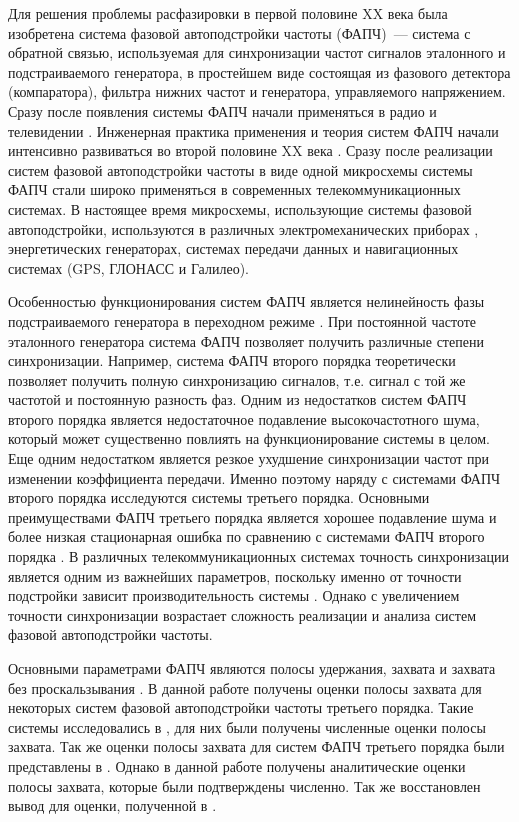 \documentclass[a4paper,article,14pt]{extarticle}
\begin{document}
Для решения проблемы расфазировки в первой половине XX века была изобретена система фазовой автоподстройки частоты \cite{appleton} (ФАПЧ)~--- система с обратной связью, используемая для синхронизации частот сигналов эталонного и подстраиваемого генератора, в простейшем виде состоящая из фазового детектора (компаратора), фильтра нижних частот и генератора, управляемого напряжением. Сразу после появления системы ФАПЧ начали применяться в радио и телевидении \cite{blagov}. Инженерная практика применения и теория систем ФАПЧ начали интенсивно развиваться во второй половине XX века \cite{seledji}. Сразу после реализации систем фазовой автоподстройки частоты в виде одной микросхемы системы ФАПЧ стали широко применяться в современных телекоммуникационных системах. В настоящее время микросхемы, использующие системы фазовой автоподстройки, используются в различных электромеханических приборах \cite{best}, энергетических генераторах, системах передачи данных \cite{ashari} и навигационных системах \cite{rao} (GPS, ГЛОНАСС и Галилео).

Особенностью функционирования систем ФАПЧ является нелинейность фазы подстраиваемого генератора в переходном режиме \cite{kuznetsov_nonlinear}. При постоянной частоте эталонного генератора система ФАПЧ позволяет получить различные степени синхронизации. Например, система ФАПЧ второго порядка теоретически позволяет получить полную синхронизацию сигналов, т.е. сигнал с той же частотой и постоянную разность фаз. Одним из недостатков систем ФАПЧ второго порядка является недостаточное подавление высокочастотного шума, который может существенно повлиять на функционирование системы в целом. Еще одним недостатком является резкое ухудшение синхронизации частот при изменении коэффициента передачи. Именно поэтому наряду с системами ФАПЧ второго порядка исследуются системы третьего порядка. Основными преимуществами ФАПЧ третьего порядка является хорошее подавление шума и более низкая стационарная ошибка по сравнению с системами ФАПЧ второго порядка \cite{thirdOrderPLL}. В различных телекоммуникационных системах точность синхронизации является одним из важнейших параметров, поскольку именно от точности подстройки зависит производительность системы \cite{UsageOfThirdOrder1}. Однако с увеличением точности синхронизации возрастает сложность реализации и анализа систем фазовой автоподстройки частоты. 

Основными параметрами ФАПЧ являются полосы удержания, захвата и захвата без проскальзывания \cite{shahgildyan}. В данной работе получены оценки полосы захвата для некоторых систем фазовой автоподстройки частоты третьего порядка. Такие системы исследовались в \cite{kuznetsov_article}, для них были получены численные оценки полосы захвата. Так же оценки полосы захвата для систем ФАПЧ третьего порядка были представлены в \cite{kuznetsov}. Однако в данной работе получены аналитические оценки полосы захвата, которые были подтверждены численно. Так же восстановлен вывод для оценки, полученной в \cite{kuznetsov}.
\end{document}
